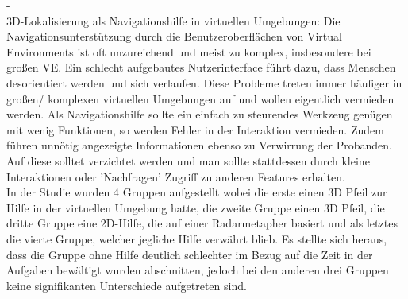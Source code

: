 - \cite{chittaro20043d}\\
3D-Lokalisierung als Navigationshilfe in virtuellen Umgebungen: Die Navigationsunterstützung durch die Benutzeroberflächen von Virtual Environments ist oft unzureichend und meist zu komplex, insbesondere bei großen VE. Ein schlecht aufgebautes Nutzerinterface führt dazu, dass Menschen desorientiert werden und sich verlaufen. Diese Probleme treten immer häufiger in großen/ komplexen virtuellen Umgebungen auf und wollen eigentlich vermieden werden. Als Navigationshilfe sollte ein einfach zu steurendes Werkzeug genügen mit wenig Funktionen, so werden Fehler in der Interaktion vermieden. Zudem führen unnötig angezeigte Informationen ebenso zu Verwirrung der Probanden. Auf diese solltet verzichtet werden und man sollte stattdessen durch kleine Interaktionen oder 'Nachfragen' Zugriff zu anderen Features erhalten. \\
In der Studie wurden 4 Gruppen aufgestellt wobei die erste einen 3D Pfeil zur Hilfe in der virtuellen Umgebung hatte, die zweite Gruppe einen 3D Pfeil, die dritte Gruppe eine 2D-Hilfe, die auf einer Radarmetapher basiert und als letztes die vierte Gruppe, welcher jegliche Hilfe verwährt blieb. Es stellte sich heraus, dass die Gruppe ohne Hilfe deutlich schlechter im Bezug auf die Zeit in der Aufgaben bewältigt wurden abschnitten, jedoch bei den anderen drei Gruppen keine signifikanten Unterschiede aufgetreten sind.
